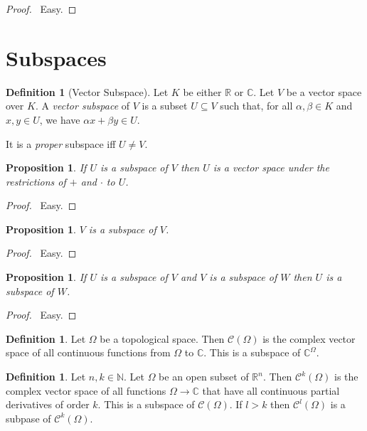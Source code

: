 \documentclass{book}
\let\qed\relax
\newtheorem{prop}[ax]{Proposition}
\theoremstyle{definition}
\newtheorem{df}[ax]{Definition}
\begin{document}
\begin{proof}
\pf\ Easy. \qed
\end{proof}

\section{Subspaces}

\begin{df}[Vector Subspace]
Let $K$ be either $\mathbb{R}$ or $\mathbb{C}$. Let $V$ be a vector space over $K$. A \emph{vector subspace} of $V$ is a subset $U \subseteq V$ such that, for all $\alpha, \beta \in K$ and $x,y \in U$, we have $\alpha x + \beta y \in U$.

It is a \emph{proper} subspace iff $U \neq V$.
\end{df}

\begin{prop}
If $U$ is a subspace of $V$ then $U$ is a vector space under the restrictions of $+$ and $\cdot$ to $U$.
\end{prop}

\begin{proof}
\pf\ Easy. \qed
\end{proof}

\begin{prop}
$V$ is a subspace of $V$.
\end{prop}

\begin{proof}
\pf\ Easy. \qed
\end{proof}

\begin{prop}
If $U$ is a subspace of $V$ and $V$ is a subspace of $W$ then $U$ is a subspace of $W$.
\end{prop}

\begin{proof}
\pf\ Easy. \qed
\end{proof}

\begin{df}
Let $\Omega$ be a topological space. Then $\mathcal{C}(\Omega)$ is the complex vector space of all continuous functions from $\Omega$ to $\mathbb{C}$. This is a subspace of $\mathbb{C}^\Omega$.
\end{df}

\begin{df}
Let $n, k \in \mathbb{N}$.
Let $\Omega$ be an open subset of $\mathbb{R}^n$. Then $\mathcal{C}^k(\Omega)$ is the complex vector space of all functions $\Omega \rightarrow \mathbb{C}$ that have all continuous partial derivatives of order $k$. This is a subspace of $\mathcal{C}(\Omega)$. If $l > k$ then $\mathcal{C}^l(\Omega)$ is a subpase of $\mathcal{C}^k(\Omega)$.
\end{df}
\end{document}
